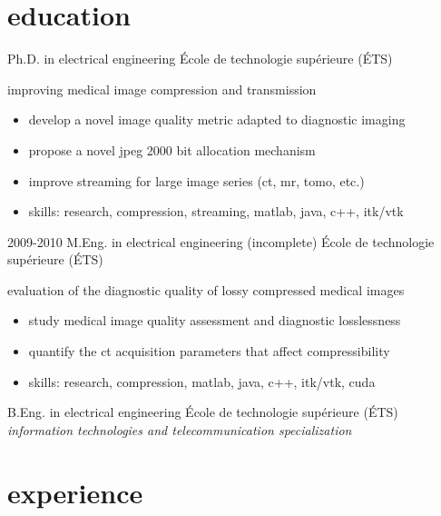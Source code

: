 \documentclass[print]{friggeri-cv}
\begin{document}
\section{education}
\begin{entrylist}
  {Ph.D. in electrical engineering}
  {École de technologie supérieure {\scriptsize (ÉTS)}}
  {improving medical image compression and transmission
  \begin{itemize}
    \item develop a novel image quality metric adapted to diagnostic imaging
    \item propose a novel jpeg 2000 bit allocation mechanism
    \item improve streaming for large image series (ct, mr, tomo, etc.)
    \item skills: research, compression, streaming, matlab, java, c++, itk/vtk
  \end{itemize}}

  \entry
  {2009-2010}
  {M.Eng. in electrical engineering (incomplete\textsuperscript{\tiny\textdaggerdbl})}
  {École de technologie supérieure {\scriptsize (ÉTS)}}
  {evaluation of the diagnostic quality of lossy compressed medical images
  \begin{itemize}
    \item study medical image quality assessment and diagnostic losslessness
    \item quantify the ct acquisition parameters that affect compressibility
    \item skills: research, compression, matlab, java, c++, itk/vtk, cuda
  \end{itemize}}

   {B.Eng. in electrical engineering}
  {École de technologie supérieure {\scriptsize (ÉTS)}}
  {\emph{information technologies and telecommunication specialization}}

\end{entrylist}

\vspace{5mm}

\section{experience}
\end{document}
